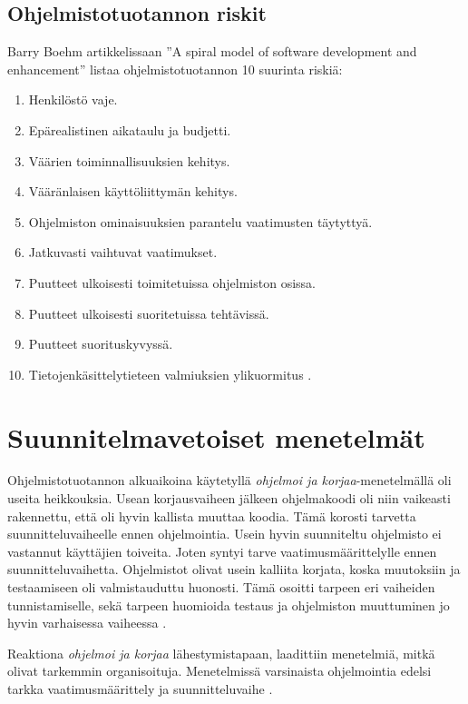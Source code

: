 \documentclass[finnish]{tktltiki2}
\theoremstyle{definition}
\theoremstyle{remark}
\begin{document}
\subsection{Ohjelmistotuotannon riskit}

Barry Boehm artikkelissaan ''A spiral model of software development and enhancement'' listaa ohjelmistotuotannon 10 suurinta riskiä: 

\begin{enumerate}
  \item Henkilöstö vaje.
  \item Epärealistinen aikataulu ja budjetti.
  \item Väärien toiminnallisuuksien kehitys.
  \item Vääränlaisen käyttöliittymän kehitys.
  \item Ohjelmiston ominaisuuksien parantelu vaatimusten täytyttyä.
  \item Jatkuvasti vaihtuvat vaatimukset.
  \item Puutteet ulkoisesti toimitetuissa ohjelmiston osissa.
  \item Puutteet ulkoisesti suoritetuissa tehtävissä.
  \item Puutteet suorituskyvyssä.
  \item Tietojenkäsittelytieteen valmiuksien ylikuormitus \cite{BOE88}.
\end{enumerate}
   

\section{Suunnitelmavetoiset menetelmät}

Ohjelmistotuotannon alkuaikoina käytetyllä \textit{ohjelmoi ja korjaa}-menetelmällä oli useita heikkouksia. Usean korjausvaiheen jälkeen ohjelmakoodi oli niin vaikeasti rakennettu, että oli hyvin kallista muuttaa koodia. Tämä korosti tarvetta suunnitteluvaiheelle ennen ohjelmointia. Usein hyvin suunniteltu ohjelmisto ei vastannut käyttäjien toiveita. Joten syntyi tarve vaatimusmäärittelylle ennen suunnitteluvaihetta. Ohjelmistot olivat usein kalliita korjata, koska muutoksiin ja testaamiseen oli valmistauduttu huonosti. Tämä osoitti tarpeen eri vaiheiden tunnistamiselle, sekä tarpeen huomioida testaus ja ohjelmiston muuttuminen jo hyvin varhaisessa vaiheessa \cite{BOE88}.

Reaktiona \textit{ohjelmoi ja korjaa} lähestymistapaan, laadittiin menetelmiä, mitkä olivat tarkemmin organisoituja. Menetelmissä varsinaista ohjelmointia edelsi tarkka vaatimusmäärittely ja suunnitteluvaihe \cite{BOE06}.
\end{document}
